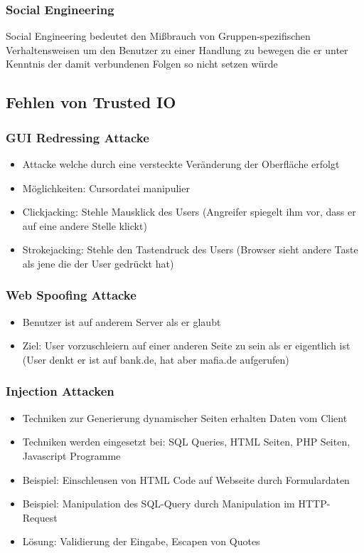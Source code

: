 \documentclass{article} %
\begin{document}
	\subsubsection{Social Engineering}
	Social Engineering bedeutet den Mißbrauch von Gruppen-spezifischen Verhaltensweisen um den Benutzer zu einer Handlung zu bewegen die er unter Kenntnis der damit verbundenen Folgen so nicht setzen würde
	\subsection{Fehlen von Trusted IO}
	\subsubsection{GUI Redressing Attacke}
	\begin{itemize}
		\item Attacke welche durch eine versteckte Veränderung der Oberfläche erfolgt 
		\item Möglichkeiten: Cursordatei manipulier
		\item Clickjacking: Stehle Mausklick des Users (Angreifer spiegelt ihm vor, dass er auf eine andere Stelle klickt)
		\item Strokejacking: Stehle den Tastendruck des Users (Browser sieht andere Taste als jene die der User gedrückt hat)
	\end{itemize}
	\subsubsection{Web Spoofing Attacke}
	\begin{itemize}
		\item Benutzer ist auf anderem Server als er glaubt
		\item Ziel: User vorzuschleiern auf einer anderen Seite zu sein als er eigentlich ist (User denkt er ist auf bank.de, hat aber mafia.de aufgerufen)
	\end{itemize}
	\subsubsection{Injection Attacken}
	\begin{itemize}
		\item Techniken zur Generierung dynamischer Seiten erhalten Daten vom Client
		\item Techniken werden eingesetzt bei: SQL Queries, HTML Seiten, PHP Seiten, Javascript Programme
		\item Beispiel: Einschleusen von HTML Code auf Webseite durch Formulardaten
		\item Beispiel: Manipulation des SQL-Query durch Manipulation im HTTP-Request
		\item Lösung: Validierung der Eingabe, Escapen von Quotes
	\end{itemize}
\end{document}
